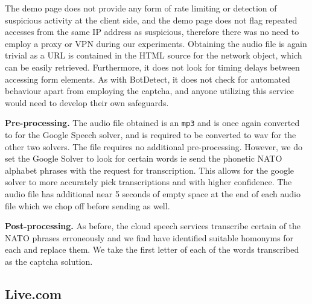 The demo page does not provide any form of rate limiting or detection of suspicious activity at the client side, 
and the demo page does not flag repeated accesses from the same IP address as suspicious, therefore there was no need 
to employ a proxy or VPN during our experiments. Obtaining the audio file is again trivial as a URL is contained in the 
HTML source for the network object, which can be easily retrieved. Furthermore, it does not look for timing delays between 
accessing form elements. As with BotDetect, it does not check for automated behaviour apart from employing the captcha, 
and anyone utilizing this service would need to develop their own safeguards.

\textbf{Pre-processing.} The audio file obtained is an \texttt{mp3} and is once again converted to  for the Google Speech solver, 
and is required to be converted to wav for the other two solvers. The file requires no additional pre-processing. However, we do
set the Google Solver to look for certain words ie send the phonetic NATO alphabet phrases with the request for transcription. 
This allows for the google solver to more accurately pick transcriptions and with higher confidence.  The audio file has additional 
near 5 seconds of empty space at the end of each audio file which we chop off before sending as well.


\textbf{Post-processing.} As before, the cloud speech services transcribe certain of the NATO phrases erroneously and we find have identified 
suitable homonyms for each and replace them. We take the first letter of each of the words transcribed as the captcha solution.

%


\subsection{Live.com}

